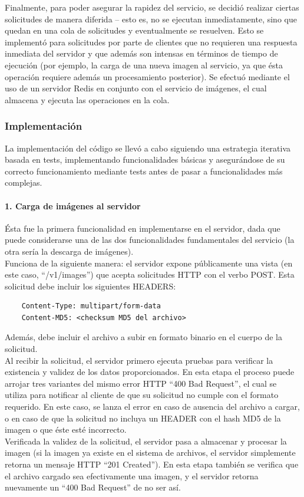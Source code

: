 \documentclass[11pt,letterpaper]{article}
\begin{document}
Finalmente, para poder asegurar la rapidez del servicio, se decidió realizar ciertas solicitudes de manera diferida -- esto es, no se ejecutan inmediatamente, sino que quedan en una cola de solicitudes y eventualmente se resuelven. Esto se implementó para solicitudes por parte de clientes que no requieren una respuesta inmediata del servidor y que además son intensas en términos de tiempo de ejecución (por ejemplo, la carga de una nueva imagen al servicio, ya que ésta operación requiere además un procesamiento posterior). Se efectuó mediante el uso de un servidor Redis en conjunto con el servicio de imágenes, el cual almacena y ejecuta las operaciones en la cola.
\newpage
\subsubsection{Implementación}

La implementación del código se llevó a cabo siguiendo una estrategia iterativa basada en tests, implementando funcionalidades básicas y asegurándose de su correcto funcionamiento mediante tests antes de pasar a funcionalidades más complejas.

\paragraph{1. Carga de imágenes al servidor}

Ésta fue la primera funcionalidad en implementarse en el servidor, dada que puede considerarse una de las dos funcionalidades fundamentales del servicio (la otra sería la descarga de imágenes).\\

Funciona de la siguiente manera: el servidor expone públicamente una vista (en este caso, ``/v1/images'') que acepta solicitudes HTTP con el verbo POST. Esta solicitud debe incluir los siguientes HEADERS:
\begin{verbatim}
    Content-Type: multipart/form-data
    Content-MD5: <checksum MD5 del archivo>
\end{verbatim}
Además, debe incluir el archivo a subir en formato binario en el cuerpo de la solicitud. \\

Al recibir la solicitud, el servidor primero ejecuta pruebas para verificar la existencia y validez de los datos proporcionados. En esta etapa el proceso puede arrojar tres variantes del mismo error HTTP ``400 Bad Request'', el cual se utiliza para notificar al cliente de que su solicitud no cumple con el formato requerido. En este caso, se lanza el error en caso de ausencia del archivo a cargar, o en caso de que la solicitud no incluya un HEADER con el hash MD5 de la imagen o que éste esté incorrecto.\\
Verificada la validez de la solicitud, el servidor pasa a almacenar y procesar la imagen (si la imagen ya existe en el sistema de archivos, el servidor simplemente retorna un mensaje HTTP ``201 Created''). En esta etapa también se verifica que el archivo cargado sea efectivamente una imagen, y el servidor retorna nuevamente un ``400 Bad Request'' de no ser así.\\
\end{document}
